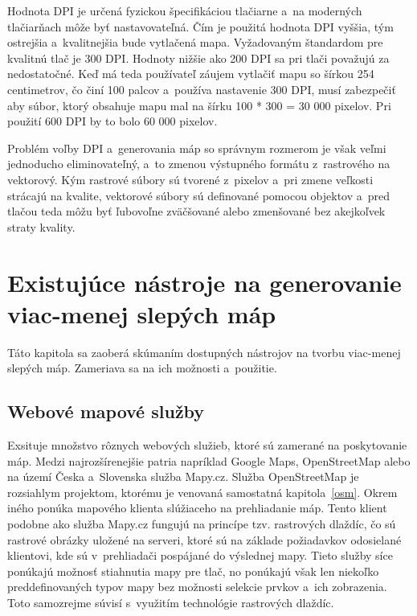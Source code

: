 Hodnota DPI je určená fyzickou špecifikáciou tlačiarne a~na moderných tlačiarňach môže byť nastavovateľná. Čím je použitá hodnota DPI vyššia, tým ostrejšia a~kvalitnejšia bude vytlačená mapa. Vyžadovaným štandardom pre kvalitnú tlač je 300 DPI. Hodnoty nižšie ako 200 DPI sa pri tlači považujú za nedostatočné. Keď má teda používateľ záujem vytlačiť mapu so šírkou 254 centimetrov, čo činí 100 palcov a~používa nastavenie 300 DPI, musí zabezpečiť aby súbor, ktorý obsahuje mapu mal na šírku 100 * 300 = 30 000 pixelov. Pri použití 600 DPI by to bolo 60 000 pixelov.

Problém voľby DPI a~generovania máp so správnym rozmerom je však veľmi jednoducho eliminovateľný, a~to zmenou výstupného formátu z~rastrového na vektorový. Kým rastrové súbory sú tvorené z~pixelov a~pri zmene veľkosti strácajú na kvalite, vektorové súbory sú definované pomocou objektov a~pred tlačou teda môžu byť ľubovoľne zväčšované alebo zmenšované bez akejkoľvek straty kvality.


\chapter{Existujúce nástroje na generovanie viac-menej slepých máp}
Táto kapitola sa zaoberá skúmaním dostupných nástrojov na tvorbu viac-menej slepých máp. Zameriava sa na ich možnosti a~použitie.

\label{existing}
\section{Webové mapové služby}
Exsituje množstvo rôznych webových služieb, ktoré sú zamerané na poskytovanie máp. Medzi najrozšírenejšie patria napríklad Google Maps, OpenStreetMap alebo na území Česka a~Slovenska služba Mapy.cz. Služba OpenStreetMap je rozsiahlym projektom, ktorému je venovaná samostatná kapitola~\ref{osm}. Okrem iného ponúka mapového klienta slúžiaceho na prehliadanie máp. Tento klient podobne ako služba Mapy.cz fungujú na princípe tzv. rastrových dlaždíc, čo sú rastrové obrázky uložené na serveri, ktoré sú na základe požiadavkov odosielané klientovi, kde sú v~prehliadači pospájané do výslednej mapy. Tieto služby síce ponúkajú možnosť stiahnutia mapy pre tlač, no ponúkajú však len niekoľko preddefinovaných typov mapy bez možnosti selekcie prvkov a~ich zobrazenia. Toto samozrejme súvisí s~využitím technológie rastrových dlaždíc.

